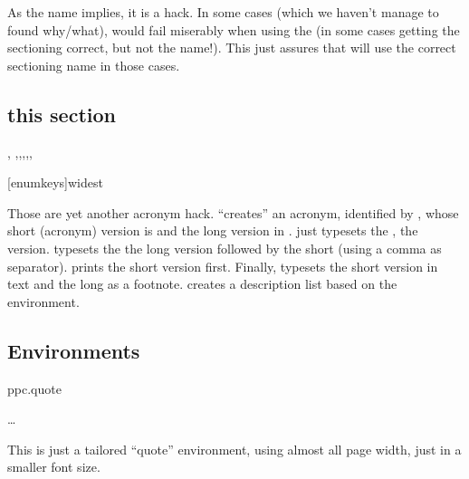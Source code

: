 \documentclass[dctools,english]{ufrgscca} %
\begin{document}
\begin{Macros}{}
    \begin{Syntax}%
    \end{Syntax}
As the name implies, it is a hack. In some cases (which we haven't manage to found why/what),  would fail miserably when using the \Macro{\nameref}{} (in some cases getting the sectioning correct, but not the name!). This just assures that \Macro{\nameref}{} will use the correct sectioning name in those cases.
\begin{stcode}[st=d.labelhack]
    \section{this section}\label{somelabel}
\end{stcode}
\end{Macros}

\begin{Macros}{\acrodef, \acro,\acrol,\acrols,\acrosl,\acrofoot,\printacrolist}
    \begin{Syntax}%
        \Macro{\printacrolist}[enumkeys]{widest}
    \end{Syntax}
Those are yet another acronym hack. \Macro{\acrodef}{} “creates” an acronym, identified by , whose short (acronym) version is  and the long version in . \Macro{\acro}{} just typesets the , \Macro{\acrol}{} the  version.
\Macro{\acrols}{} typesets the the long version followed by the short (using a comma as separator).
\Macro{\acrosl}{} prints the short version first. Finally, \Macro{\acrofoot}{} typesets the short version in text and the long as a footnote. \Macro{\printacrolist}{} creates a description list based on the  environment.
\end{Macros}

\subsection{Environments}
\begin{Envs}{ppc.quote}
    \begin{Syntax}%
    \Macro{\begin{ppc.quote}}{} \ldots \Macro{\end{ppc.quote}}{}
    \end{Syntax}
\end{Envs}
This is just a tailored “quote” environment, using almost all page width, just in a smaller font size.
\end{document}
